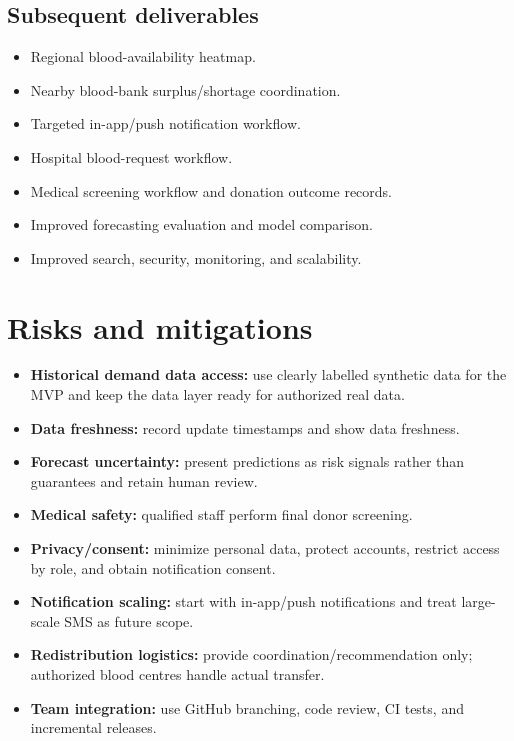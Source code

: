 \documentclass[11pt,a4paper]{article}
\begin{document}
\subsection{Subsequent deliverables}
\begin{itemize}[leftmargin=0.7cm]
\item Regional blood-availability heatmap.
\item Nearby blood-bank surplus/shortage coordination.
\item Targeted in-app/push notification workflow.
\item Hospital blood-request workflow.
\item Medical screening workflow and donation outcome records.
\item Improved forecasting evaluation and model comparison.
\item Improved search, security, monitoring, and scalability.
\end{itemize}

\section{Risks and mitigations}
\begin{itemize}[leftmargin=0.7cm]
\item \textbf{Historical demand data access:} use clearly labelled synthetic data for the MVP and keep the data layer ready for authorized real data.
\item \textbf{Data freshness:} record update timestamps and show data freshness.
\item \textbf{Forecast uncertainty:} present predictions as risk signals rather than guarantees and retain human review.
\item \textbf{Medical safety:} qualified staff perform final donor screening.
\item \textbf{Privacy/consent:} minimize personal data, protect accounts, restrict access by role, and obtain notification consent.
\item \textbf{Notification scaling:} start with in-app/push notifications and treat large-scale SMS as future scope.
\item \textbf{Redistribution logistics:} provide coordination/recommendation only; authorized blood centres handle actual transfer.
\item \textbf{Team integration:} use GitHub branching, code review, CI tests, and incremental releases.
\end{itemize}
\end{document}
